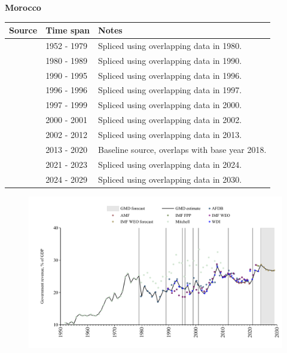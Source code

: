\documentclass[12pt,a4paper,landscape]{article}
\begin{document}
\begin{adjustbox}{max totalsize={\paperwidth}{\paperheight},center}
\begin{minipage}[t][\textheight][t]{\textwidth}
\vspace*{0.5cm}
{}
\begin{center}
{\Large\bfseries Morocco}
\end{center}
\vspace{0.5cm}
\begin{table}[H]
\centering
\small
\begin{tabular}{|l|l|l|}
\hline
\textbf{Source} & \textbf{Time span} & \textbf{Notes} \\
\hline
\rowcolor{white}\cite{Mitchell}& 1952 - 1979 &Spliced using overlapping data in 1980.\\
\rowcolor{lightgray}\cite{AFDB}& 1980 - 1989 &Spliced using overlapping data in 1990.\\
\rowcolor{white}\cite{WDI}& 1990 - 1995 &Spliced using overlapping data in 1996.\\
\rowcolor{lightgray}\cite{AFDB}& 1996 - 1996 &Spliced using overlapping data in 1997.\\
\rowcolor{white}\cite{WDI}& 1997 - 1999 &Spliced using overlapping data in 2000.\\
\rowcolor{lightgray}\cite{AFDB}& 2000 - 2001 &Spliced using overlapping data in 2002.\\
\rowcolor{white}\cite{WDI}& 2002 - 2012 &Spliced using overlapping data in 2013.\\
\rowcolor{lightgray}\cite{AMF}& 2013 - 2020 &Baseline source, overlaps with base year 2018.\\
\rowcolor{white}\cite{WDI}& 2021 - 2023 &Spliced using overlapping data in 2024.\\
\rowcolor{lightgray}\cite{IMF_WEO_forecast}& 2024 - 2029 &Spliced using overlapping data in 2030.\\
\hline
\end{tabular}
\end{table}
\begin{figure}[H]
\centering
\includegraphics[width=\textwidth,height=0.6\textheight,keepaspectratio]{graphs/MAR_govrev_GDP.pdf}
\end{figure}
\end{minipage}
\end{adjustbox}
\end{document}
